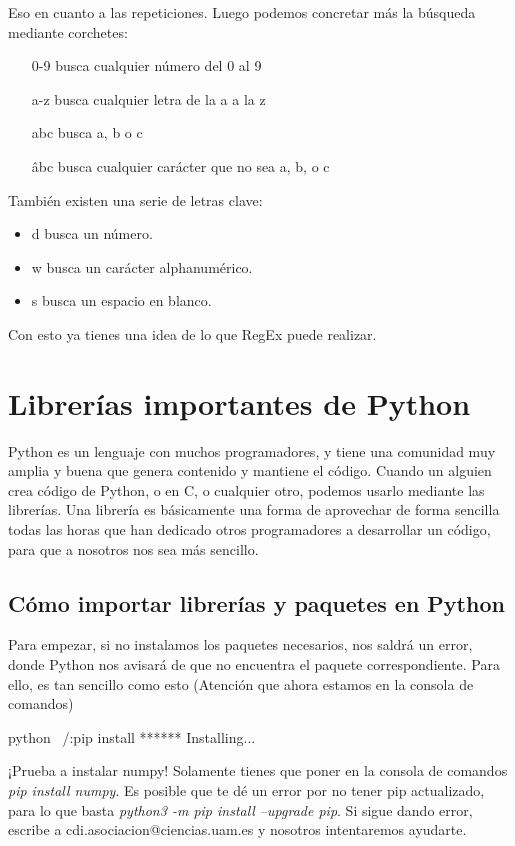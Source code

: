 \documentclass{article}
\begin{document}
Eso en cuanto a las repeticiones. Luego podemos concretar más la búsqueda mediante corchetes:

\begin{itemize}
    \item [0-9] busca cualquier número del 0 al 9
    \item [a-z] busca cualquier letra de la a a la z
    \item [abc] busca a, b o c
    \item [\^abc] busca cualquier carácter que no sea a, b, o c
\end{itemize}
También existen una serie de letras clave:

\begin{itemize}
    \item d busca un número.
    \item w busca un carácter alphanumérico.
    \item s busca un espacio en blanco.
\end{itemize}

Con esto ya tienes una idea de lo que RegEx puede realizar.


\section{Librerías importantes de Python}
Python es un lenguaje con muchos programadores, y tiene una comunidad muy amplia y buena que genera contenido y mantiene el código. Cuando un alguien crea código de Python, o en C, o cualquier otro, podemos usarlo mediante las librerías. Una librería es básicamente una forma de aprovechar de forma sencilla todas las horas que han dedicado otros programadores a desarrollar un código, para que a nosotros nos sea más sencillo.


\subsection{Cómo importar librerías y paquetes en Python}
Para empezar, si no instalamos los paquetes necesarios, nos saldrá un error, donde Python nos avisará de que no encuentra el paquete correspondiente. Para ello, es tan sencillo como esto (Atención que ahora estamos en la consola de comandos)
\begin{mintedbox}{python}
    ~/:pip install ******
    Installing...
\end{mintedbox}
¡Prueba a instalar numpy! Solamente tienes que poner en la consola de comandos \textit{pip install numpy}. Es posible que te dé un error por no tener pip actualizado, para lo que basta \textit{python3 -m pip install --upgrade pip}. Si sigue dando error, escribe a cdi.asociacion@ciencias.uam.es y nosotros intentaremos ayudarte.
\end{document}
